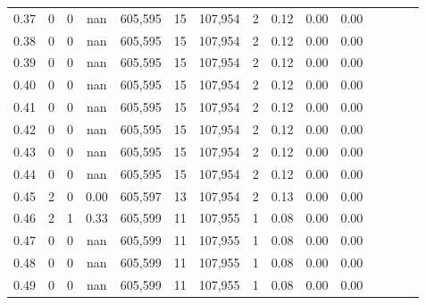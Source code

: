 \begin{tabular}{rrrcrrrrrrrrrrr}
0.37 &        0 &       0 &                                        nan &  605,595 &       15 &  107,954 &        2 &  0.12 &  0.00 &                         0.00 \\
0.38 &        0 &       0 &                                        nan &  605,595 &       15 &  107,954 &        2 &  0.12 &  0.00 &                         0.00 \\
0.39 &        0 &       0 &                                        nan &  605,595 &       15 &  107,954 &        2 &  0.12 &  0.00 &                         0.00 \\
0.40 &        0 &       0 &                                        nan &  605,595 &       15 &  107,954 &        2 &  0.12 &  0.00 &                         0.00 \\
0.41 &        0 &       0 &                                        nan &  605,595 &       15 &  107,954 &        2 &  0.12 &  0.00 &                         0.00 \\
0.42 &        0 &       0 &                                        nan &  605,595 &       15 &  107,954 &        2 &  0.12 &  0.00 &                         0.00 \\
0.43 &        0 &       0 &                                        nan &  605,595 &       15 &  107,954 &        2 &  0.12 &  0.00 &                         0.00 \\
0.44 &        0 &       0 &                                        nan &  605,595 &       15 &  107,954 &        2 &  0.12 &  0.00 &                         0.00 \\
0.45 &        2 &       0 &                                       0.00 &  605,597 &       13 &  107,954 &        2 &  0.13 &  0.00 &                         0.00 \\
0.46 &        2 &       1 &                                       0.33 &  605,599 &       11 &  107,955 &        1 &  0.08 &  0.00 &                         0.00 \\
0.47 &        0 &       0 &                                        nan &  605,599 &       11 &  107,955 &        1 &  0.08 &  0.00 &                         0.00 \\
0.48 &        0 &       0 &                                        nan &  605,599 &       11 &  107,955 &        1 &  0.08 &  0.00 &                         0.00 \\
0.49 &        0 &       0 &                                        nan &  605,599 &       11 &  107,955 &        1 &  0.08 &  0.00 &                         0.00 \\

\end{tabular}
